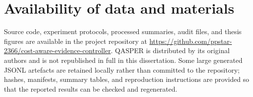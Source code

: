 \section*{Availability of data and materials}

Source code, experiment protocols, processed summaries, audit files, and thesis figures are available in the project repository at \url{https://github.com/ppstar-2366/cost-aware-evidence-controller}. QASPER is distributed by its original authors and is not republished in full in this dissertation. Some large generated JSONL artefacts are retained locally rather than committed to the repository; hashes, manifests, summary tables, and reproduction instructions are provided so that the reported results can be checked and regenerated.

